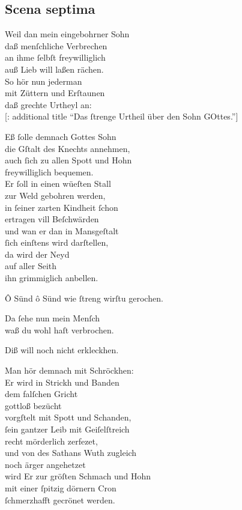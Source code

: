 \documentclass{ees}
\newenvironment{lyrics}[1]{%
  \subsection{#1}\nopagebreak%
  \begin{lyricslist}%
  \let\voice\item%
}{%
  \end{lyricslist}%
}
\begin{document}
\clearpage
\begin{lyrics}{Scena septima}
  \voice[Schöpffer]
  Weil dan mein eingebohrner Sohn\\
  daß menſchliche Verbrechen\\
  an ihme ſelbſt freywilliglich\\
  auß Lieb will laßen rächen.\\
  So hör nun jederman\\
  mit Züttern und Erſtaunen\\
  daß grechte Urtheyl an:\\[1ex]
  [: additional title “Das ſtrenge Urtheil über den Sohn GOttes.”]

  \voice[Gerecht.]
  Eß ſolle demnach Gottes Sohn\\
  die Gſtalt des Knechts annehmen,\\
  auch ſich zu allen Spott und Hohn\\
  freywilliglich bequemen.\\
  Er ſoll in einen wüeſten Stall\\
  zur Weld gebohren werden,\\
  in ſeiner zarten Kindheit ſchon\\
  ertragen vill Beſchwärden\\
  und wan er dan in Mansgeſtalt\\
  ſich einſtens wird darſtellen,\\
  da wird der Neyd\\
  auf aller Seith\\
  ihn grimmiglich anbellen.

  \voice[Adam]
  Ô Sünd ô Sünd wie ſtreng wirſtu gerochen.

  \voice[Barmh.]
  Da ſehe nun mein Menſch\\
  waß du wohl haſt verbrochen.\\

  \voice[Schöpffer]
  Diß will noch nicht erkleckhen.

  \voice[Gerecht.]
  Man hör demnach mit Schröckhen:\\
  Er wird in Strickh und Banden\\
  dem falſchen Gricht\\
  gottloß bezücht\\
  vorgſtelt mit Spott und Schanden,\\
  ſein gantzer Leib mit Geiſelſtreich\\
  recht mörderlich zerfezet,\\
  und von des Sathans Wuth zugleich\\
  noch ärger angehetzet\\
  wird Er zur gröſten Schmach und Hohn\\
  mit einer ſpitzig dörnern Cron\\
  ſchmerzhafft gecrönet werden.


\end{lyrics}
\end{document}
